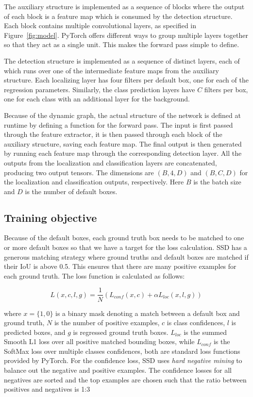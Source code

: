 The auxiliary structure is implemented as a sequence of blocks where the output of each block is a feature map which is consumed by the detection structure.
Each block contains multiple convolutional layers, as specified in Figure~\ref{fig:model}.
PyTorch offers different ways to group multiple layers together so that they act as a single unit.
This makes the forward pass simple to define.

The detection structure is implemented as a sequence of distinct layers, each of which runs over one of the intermediate feature maps from the auxiliary structure.
Each localizing layer has four filters per default box, one for each of the regression parameters.
Similarly, the class prediction layers have \(C\) filters per box, one for each class with an additional layer for the background.

Because of the dynamic graph, the actual structure of the network is defined at runtime by defining a function for the forward pass.
The input is first passed through the feature extractor, it is then passed through each block of the auxiliary structure, saving each feature map.
The final output is then generated by running each feature map through the corresponding detection layer.
All the outputs from the localization and classification layers are concatenated, producing two output tensors.
The dimensions are \(\left(B,4,D\right) \) and \(\left(B,C,D\right) \) for the localization and classification outputs, respectively.
Here \(B\) is the batch size and \(D\) is the number of default boxes.


\subsection*{Training objective}
Because of the default boxes, each ground truth box needs to be matched to one or more default boxes so that we have a target for the loss calculation.
SSD has a generous matching strategy where ground truths and default boxes are matched if their IoU is above 0.5.
This ensures that there are many positive examples for each ground truth.
The loss function is calculated as follows:

\[L(x,c,l,g)=\frac{1}{N}\left( L_{conf}(x,c) + \alpha L_{loc}(x,l,g)\right) \]

where \( x=\{1,0\} \) is a binary mask denoting a match between a default box and ground truth, \( N \) is the number of positive examples, \( c \) is class confidences, \( l \) is predicted boxes, and \( g \) is regressed ground truth boxes.  \( L_{loc} \) is the summed Smooth L1 loss over all positive matched bounding boxes, while \( L_{conf} \) is the SoftMax loss over multiple classes confidences, both are standard loss functions provided by PyTorch.
For the confidence loss, SSD uses \textit{hard negative mining} to balance out the negative and positive examples.
The confidence losses for all negatives are sorted and the top examples are chosen such that the ratio between positives and negatives is 1:3


